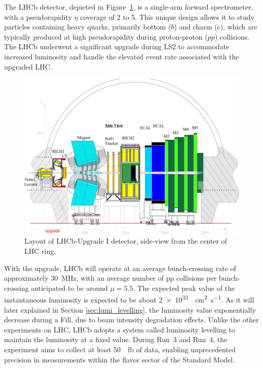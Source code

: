 The LHCb detector, depicted in Figure~\ref{fig:lhcb-detector}, is a single-arm forward spectrometer, with a pseudorapidity $\eta$ coverage of 2 to 5. This unique design allows it to study particles containing heavy quarks, primarily bottom ($b$) and charm ($c$), which are typically produced at high pseudorapidity during proton-proton ($pp$) collisions. The LHCb underwent a significant upgrade during LS$2$ to accommodate increased luminosity and handle the elevated event rate associated with the upgraded LHC.
\begin{figure}[h]
    \centering
    \includegraphics[width=\textwidth]{figures/UT-upgrade-detector-scaled.jpeg}
    \caption{Layout of LHCb-Upgrade I detector, side-view from the center of LHC ring.}
    \label{fig:lhcb-detector}
\end{figure}
With the upgrade, LHCb will operate at an average bunch-crossing rate of approximately \SI{30}{\mega\hertz}, with an average number of pp collisions per bunch-crossing anticipated to be around $\mu=5.5$. The expected peak value of the instantaneous luminosity is expected to be about \SI{2e33}{\per\centi\meter\squared\per\second}. As it will later explained in Section \ref{sec:lumi_levelling}, the luminosity value exponentially decrease during a Fill, due to beam intensity degradation effects. Unlike the other experiments on LHC, LHCb adopts a system called luminosity levelling to maintain the luminosity at a fixed value.  During Run~3 and Run~4, the experiment aims to collect at least \SI{50}{\per\femto\barn} of data, enabling unprecedented precision in measurements within the flavor sector of the Standard Model.


